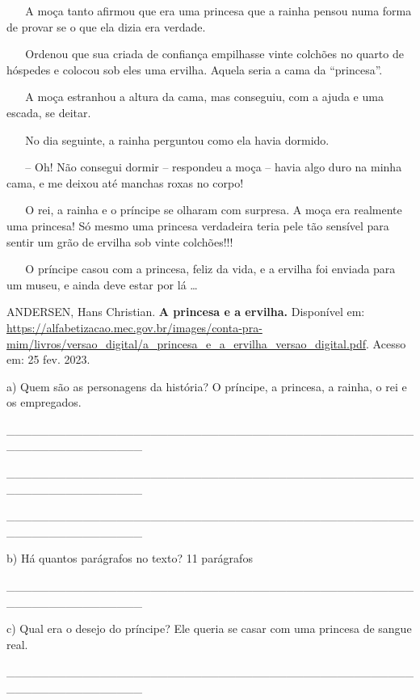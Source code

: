 ~ ~ A moça tanto afirmou que era uma princesa que a rainha pensou numa
forma de provar se o que ela dizia era verdade.

~ ~ Ordenou que sua criada de confiança empilhasse vinte colchões no
quarto de hóspedes e colocou sob eles uma ervilha. Aquela seria a cama
da ``princesa''.

~ ~ A moça estranhou a altura da cama, mas conseguiu, com a ajuda e uma
escada, se deitar.

~ ~ No dia seguinte, a rainha perguntou como ela havia dormido.

~ ~ -- Oh! Não consegui dormir -- respondeu a moça -- havia algo duro na
minha cama, e me deixou até manchas roxas no corpo!

~ ~ \protect\hypertarget{_Hlk128236047}{}{}O rei, a rainha e o príncipe
se olharam com surpresa. A moça era realmente uma princesa! Só mesmo uma
princesa verdadeira teria pele tão sensível para sentir um grão de
ervilha sob vinte colchões!!!

~ ~ O príncipe casou com a princesa, feliz da vida, e a ervilha foi
enviada para um museu, e ainda deve estar por lá \ldots{}

ANDERSEN, Hans Christian. \textbf{A princesa e a ervilha.} Disponível
em:
\url{https://alfabetizacao.mec.gov.br/images/conta-pra-mim/livros/versao_digital/a_princesa_e_a_ervilha_versao_digital.pdf}.
Acesso em: 25 fev. 2023.

a) Quem são as personagens da história? O príncipe, a princesa, a
rainha, o rei e os empregados.

\_\_\_\_\_\_\_\_\_\_\_\_\_\_\_\_\_\_\_\_\_\_\_\_\_\_\_\_\_\_\_\_\_\_\_\_\_\_\_\_\_\_\_\_\_\_\_\_\_\_\_\_\_\_\_\_\_\_\_\_\_\_\_\_

\_\_\_\_\_\_\_\_\_\_\_\_\_\_\_\_\_\_\_\_\_\_\_\_\_\_\_\_\_\_\_\_\_\_\_\_\_\_\_\_\_\_\_\_\_\_\_\_\_\_\_\_\_\_\_\_\_\_\_\_\_\_\_\_

\_\_\_\_\_\_\_\_\_\_\_\_\_\_\_\_\_\_\_\_\_\_\_\_\_\_\_\_\_\_\_\_\_\_\_\_\_\_\_\_\_\_\_\_\_\_\_\_\_\_\_\_\_\_\_\_\_\_\_\_\_\_\_\_

b) Há quantos parágrafos no texto? 11 parágrafos

\_\_\_\_\_\_\_\_\_\_\_\_\_\_\_\_\_\_\_\_\_\_\_\_\_\_\_\_\_\_\_\_\_\_\_\_\_\_\_\_\_\_\_\_\_\_\_\_\_\_\_\_\_\_\_\_\_\_\_\_\_\_\_\_

c) Qual era o desejo do príncipe? Ele queria se casar com uma princesa
de sangue real.

\_\_\_\_\_\_\_\_\_\_\_\_\_\_\_\_\_\_\_\_\_\_\_\_\_\_\_\_\_\_\_\_\_\_\_\_\_\_\_\_\_\_\_\_\_\_\_\_\_\_\_\_\_\_\_\_\_\_\_\_\_\_\_\_

